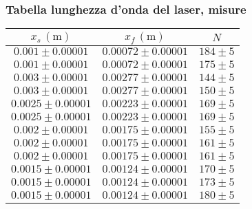 \subsubsection{Tabella lunghezza d'onda del laser, misure}
    \begin{table}[H]
    \centering
        \begin{tabular}{|c|c|c|}
        \hline
        $ x_s \, (\text{m}) $ & $ x_f \, (\text{m}) $ & $ N $ \\
        \hline
        $0.001 \pm 0.00001$ & $0.00072 \pm 0.00001$ & $184 \pm 5$ \\
        \hline
        $0.001 \pm 0.00001$ & $0.00072 \pm 0.00001$ & $175 \pm 5$ \\
        \hline
        $0.003 \pm 0.00001$ & $0.00277 \pm 0.00001$ & $144 \pm 5$ \\
        \hline
        $0.003 \pm 0.00001$ & $0.00277 \pm 0.00001$ & $150 \pm 5$ \\
        \hline
        $0.0025 \pm 0.00001$ & $0.00223 \pm 0.00001$ & $169 \pm 5$ \\
        \hline
        $0.0025 \pm 0.00001$ & $0.00223 \pm 0.00001$ & $169 \pm 5$ \\
        \hline
        $0.002 \pm 0.00001$ & $0.00175 \pm 0.00001$ & $155 \pm 5$ \\
        \hline
        $0.002 \pm 0.00001$ & $0.00175 \pm 0.00001$ & $161 \pm 5$ \\
        \hline
        $0.002 \pm 0.00001$ & $0.00175 \pm 0.00001$ & $161 \pm 5$ \\
        \hline
        $0.0015 \pm 0.00001$ & $0.00124 \pm 0.00001$ & $170 \pm 5$ \\
        \hline
        $0.0015 \pm 0.00001$ & $0.00124 \pm 0.00001$ & $173 \pm 5$ \\
        \hline
        $0.0015 \pm 0.00001$ & $0.00124 \pm 0.00001$ & $180 \pm 5$ \\
        \hline
        \end{tabular}
    \end{table}


